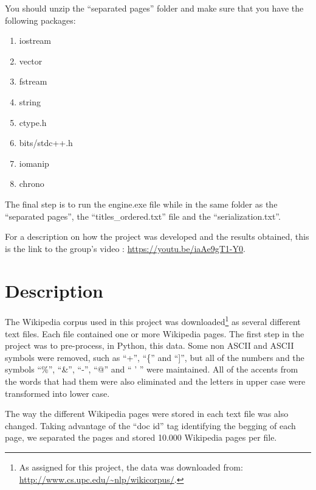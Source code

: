 \documentclass{article}
\begin{document}
You should unzip the ``separated pages'' folder and make sure that you have the following packages:
\begin{enumerate}
\item iostream
\item vector
\item fstream
\item string
\item ctype.h
\item bits/stdc++.h
\item iomanip
\item chrono
 \end{enumerate}

The final step is to run the engine.exe file while in the same folder as the  ``separated pages'', the ``titles\_ordered.txt'' file and the ``serialization.txt''.

For a description on how the project was developed and the results obtained, this is the link to the group's video : \url{https://youtu.be/iaAe9gT1-Y0}. 

\section*{Description}
The Wikipedia corpus used in this project was downloaded\footnote{As assigned for this project, the data was downloaded from: \url{http://www.cs.upc.edu/~nlp/wikicorpus/}.}  as several different text files. Each file contained one or more Wikipedia pages. The first step in the project was to pre-process, in Python, this data. Some non ASCII and ASCII symbols were removed, such as ``+'', ``\{'' and ``]'', but all of the numbers and the symbols ``\%'', ``\&'', ``-'', ``@'' and `` ' '' were maintained. All of the accents from the words that had them were also eliminated and the letters in upper case were transformed into lower case. 

The way the different Wikipedia pages were stored in each text file was also changed. Taking advantage of the ``doc id'' tag identifying the begging of each page, we separated the pages and stored 10.000 Wikipedia pages per file. 
\end{document}

